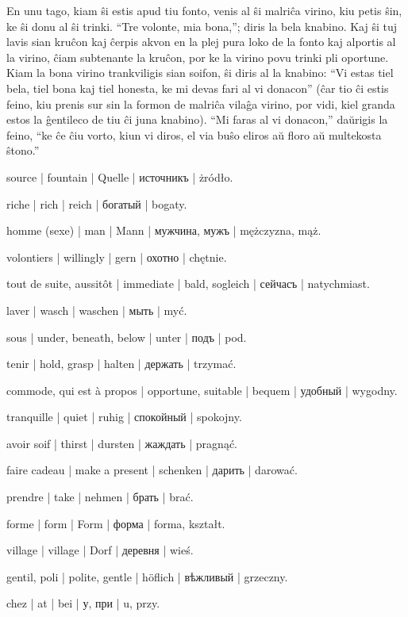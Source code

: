 En unu tago, kiam ŝi estis apud tiu fonto, venis al ŝi malriĉa virino, kiu petis ŝin, ke ŝi donu al ŝi trinki. “Tre volonte, mia bona,”; diris la bela knabino. Kaj ŝi tuj lavis sian kruĉon kaj ĉerpis akvon en la plej pura loko de la fonto kaj alportis al la virino, ĉiam subtenante la kruĉon, por ke la virino povu trinki pli oportune. Kiam la bona virino trankviligis sian soifon, ŝi diris al la knabino: “Vi estas tiel bela, tiel bona kaj tiel honesta, ke mi devas fari al vi donacon” (ĉar tio ĉi estis feino, kiu prenis sur sin la formon de malriĉa vilaĝa virino, por vidi, kiel granda estos la ĝentileco de tiu ĉi juna knabino). “Mi faras al vi donacon,” daŭrigis la feino, “ke ĉe ĉiu vorto, kiun vi diros, el via buŝo eliros aŭ floro aŭ multekosta ŝtono.”

\begin{ekzvocab}{1em}
 source | fountain | Quelle | источникъ | żródło.

 riche | rich | reich | богатый | bogaty.

 homme (sexe) | man | Mann | мужчина, мужъ | mężczyzna, mąż.

 volontiers | willingly | gern | охотно | chętnie.

 tout de suite, aussitôt | immediate | bald, sogleich | сейчасъ | natychmiast.

 laver | wasch | waschen | мыть | myć.

 sous | under, beneath, below | unter | подъ | pod.

 tenir | hold, grasp | halten | держать | trzymać.

 commode, qui est à propos | opportune, suitable | bequem | удобный | wygodny.

 tranquille | quiet | ruhig | спокойный | spokojny.

 avoir soif | thirst | dursten | жаждать | pragnąć.

 faire cadeau | make a present | schenken | дарить | darować.

 prendre | take | nehmen | брать | brać.

 forme | form | Form | форма | forma, kształt.

 village | village | Dorf | деревня | wieś.

 gentil, poli | polite, gentle | höflich | вѣжливый | grzeczny.

 chez | at | bei | у, при | u, przy.

\end{ekzvocab}


